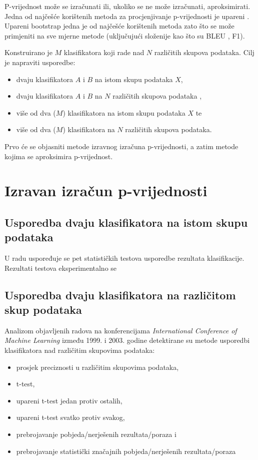 P-vrijednost može se izračunati ili, ukoliko se ne može izračunati, aproksimirati. Jedna od najčešće korištenih metoda za procjenjivanje p-vrijednosti je upareni . Upareni bootstrap jedna je od najčešće korištenih metoda \citep{koehn2004statistical} zato što se može primjeniti na sve mjerne metode (uključujući složenije kao što su BLEU \citep{papineni2002bleu}, F1). 

Konstruirano je $M$ klasifikatora koji rade nad $N$ različitih skupova podataka. Cilj je napraviti usporedbe:

\begin{itemize}
\item dvaju klasifikatora $A$ i $B$ na istom skupu podataka $X$,
\item dvaju klasifikatora $A$ i $B$ na $N$ različitih skupova podataka ,
\item više od dva ($M$) klasifikatora  na istom skupu podataka $X$ te
\item više od dva ($M$) klasifikatora na $N$ različitih skupova podataka.
\end{itemize}
Prvo će se objasniti metode izravnog izračuna p-vrijednosti, a zatim metode kojima se aproksimira p-vrijednost.

\section{Izravan izračun p-vrijednosti}

\subsection{Usporedba dvaju klasifikatora na istom skupu podataka}

U radu \citep{dietterich1998approximate} uspoređuje se pet statističkih testova usporedbe rezultata klasifikacije. Rezultati testova eksperimentalno se

\subsection{Usporedba dvaju klasifikatora na različitom skup podataka}
\label{subsec:couting}

Analizom objavljenih radova na konferencijama \textit{International Conference of Machine Learning} između 1999. i 2003. godine \citep{demvsar2006statistical} detektirane su metode usporedbi klasifikatora nad različitim skupovima podataka:
\begin{itemize}
\item prosjek preciznosti u različitim skupovima podataka,
\item t-test,
\item upareni t-test jedan protiv ostalih,
\item upareni t-test svatko protiv svakog,
\item prebrojavanje pobjeda/nerješenih rezultata/poraza i
\item prebrojavanje statistički značajnih pobjeda/nerješenih rezultata/poraza
\end{itemize}

